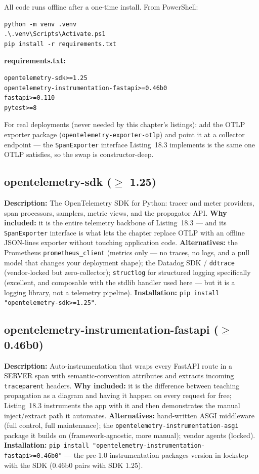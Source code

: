 All code runs offline after a one-time install. From PowerShell:

\begin{verbatim}
python -m venv .venv
.\.venv\Scripts\Activate.ps1
pip install -r requirements.txt
\end{verbatim}

\noindent\textbf{requirements.txt:}
\begin{verbatim}
opentelemetry-sdk>=1.25
opentelemetry-instrumentation-fastapi>=0.46b0
fastapi>=0.110
pytest>=8
\end{verbatim}

For real deployments (never needed by this chapter's listings): add the
OTLP exporter package (\texttt{opentelemetry-exporter-otlp}) and point it
at a collector endpoint --- the \texttt{SpanExporter} interface Listing~18.3
implements is the same one OTLP satisfies, so the swap is constructor-deep.

\subsection{opentelemetry-sdk ($\geq$ 1.25)}
\textbf{Description:} The OpenTelemetry SDK for Python: tracer and meter
providers, span processors, samplers, metric views, and the propagator API.
\textbf{Why included:} it is the entire telemetry backbone of Listing~18.3
--- and its \texttt{SpanExporter} interface is what lets the chapter replace
OTLP with an offline JSON-lines exporter without touching application
code. \textbf{Alternatives:} the Prometheus \texttt{prometheus\_client}
(metrics only --- no traces, no logs, and a pull model that changes your
deployment shape); the Datadog SDK / \texttt{ddtrace} (vendor-locked but
zero-collector); \texttt{structlog} for structured logging specifically
(excellent, and composable with the stdlib handler used here --- but it is
a logging library, not a telemetry pipeline). \textbf{Installation:}
\texttt{pip install "opentelemetry-sdk>=1.25"}.

\subsection{opentelemetry-instrumentation-fastapi ($\geq$ 0.46b0)}
\textbf{Description:} Auto-instrumentation that wraps every FastAPI route
in a SERVER span with semantic-convention attributes and extracts incoming
\texttt{traceparent} headers. \textbf{Why included:} it is the difference
between teaching propagation as a diagram and having it happen on every
request for free; Listing~18.3 instruments the app with it and then
demonstrates the manual inject/extract path it automates.
\textbf{Alternatives:} hand-written ASGI middleware (full control, full
maintenance); the \texttt{opentelemetry-instrumentation-asgi} package it
builds on (framework-agnostic, more manual); vendor agents (locked).
\textbf{Installation:}
\texttt{pip install "opentelemetry-instrumentation-fastapi>=0.46b0"} ---
the pre-1.0 instrumentation packages version in lockstep with the SDK
(0.46b0 pairs with SDK 1.25).

